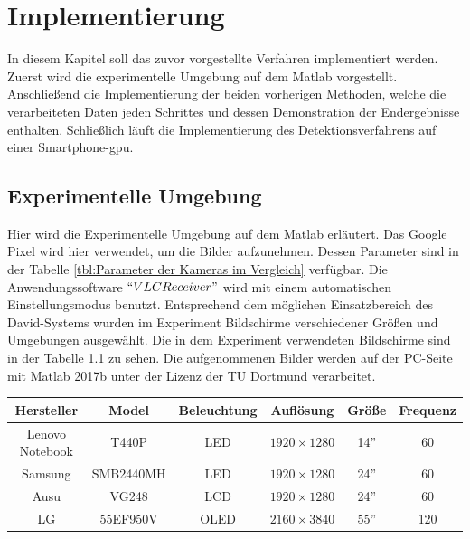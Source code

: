 \chapter{Implementierung} \label{cha:Implementierung}

In diesem Kapitel soll das zuvor vorgestellte Verfahren implementiert werden. Zuerst wird die experimentelle Umgebung auf dem Matlab vorgestellt. Anschließend die Implementierung der beiden vorherigen Methoden, welche die verarbeiteten Daten jeden Schrittes und dessen Demonstration der Endergebnisse enthalten. Schließlich läuft die Implementierung des Detektionsverfahrens auf einer Smartphone-\gls{gpu}.

\section{Experimentelle Umgebung}

Hier wird die Experimentelle Umgebung auf dem Matlab erläutert. Das Google Pixel wird hier verwendet, um die Bilder aufzunehmen. Dessen Parameter sind in der Tabelle \ref{tbl:Parameter der Kameras im Vergleich} verfügbar. Die Anwendungssoftware $ ``VLCReceiver" $ wird mit einem automatischen Einstellungsmodus benutzt. Entsprechend dem möglichen Einsatzbereich des David-Systems wurden im Experiment Bildschirme verschiedener Größen und Umgebungen ausgewählt. Die in dem Experiment verwendeten Bildschirme sind in der Tabelle \ref{tbl:Verwendeter Bildschirm} zu sehen. Die aufgenommenen Bilder werden auf der PC-Seite mit Matlab 2017b unter der Lizenz der TU Dortmund verarbeitet.

\begin{table}[htb]
	\label{tbl:Verwendeter Bildschirm}
	\footnotesize
	\centering
	\begin{tabular}{|c|c|c|c|c|c|}
	\toprule
	\textbf{Hersteller} & \textbf{Model} & \textbf{Beleuchtung} & \textbf{Auflösung} & \textbf{Größe}	& \textbf{Frequenz}\\
	\midrule
	Lenovo Notebook & T440P & LED & $ 1920 \times 1280$ & 14'' & 60 \\
	Samsung 	  & SMB2440MH   & LED & $ 1920 \times 1280$ & 24'' & 60 \\
	Ausu  		  & VG248   & LCD & $ 1920 \times 1280$ & 24'' & 60 \\
	LG  		  & 55EF950V & OLED & $ 2160 \times 3840$ & 55'' & 120 \\
	
	\bottomrule
	\end{tabular}
\end{table} 

